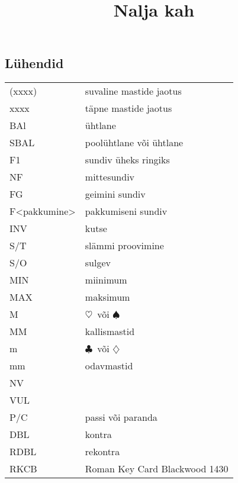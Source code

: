 \documentclass[10pt]{article}
\title{Nalja kah\vspace{-1em}}
\renewcommand{\c}{$\clubsuit$}
\renewcommand{\d}{$\diamondsuit$}
\newcommand{\h}{$\heartsuit$}
\newcommand{\s}{$\spadesuit$}
\begin{document}
\begin{multicols*}{2}
\maketitle
\tableofcontents

\section{Lühendid}
\begin{tabular}{l l}
  (xxxx)       & suvaline mastide jaotus       \\
  xxxx         & täpne mastide jaotus          \\
  BAl          & ühtlane                       \\
  SBAL         & poolühtlane või ühtlane       \\
  F1           & sundiv üheks ringiks          \\
  NF           & mittesundiv                   \\
  FG           & geimini sundiv                \\
  F<pakkumine> & pakkumiseni sundiv            \\
  INV          & kutse                         \\
  S/T          & slämmi proovimine             \\
  S/O          & sulgev                        \\
  MIN          & miinimum                      \\
  MAX          & maksimum                      \\
  M            & \h\ või \s\                   \\
  MM           & kallismastid                  \\
  m            & \c\ või \d\                   \\
  mm           & odavmastid                    \\
  NV           &                               \\
  VUL          &                               \\
  P/C          & passi või paranda             \\
  DBL          & kontra                        \\
  RDBL         & rekontra                      \\
  RKCB         & Roman Key Card Blackwood 1430
\end{tabular}


\end{multicols*}
\end{document}
